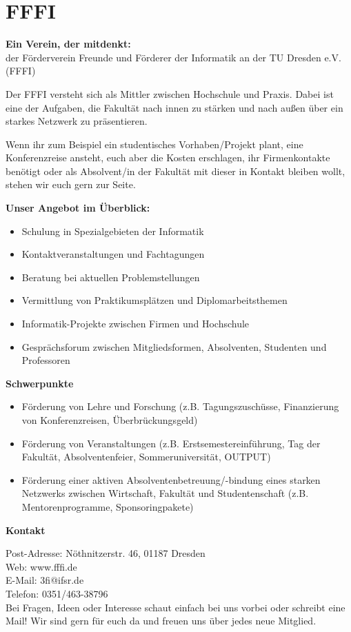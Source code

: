 \section{FFFI}

\textbf{Ein Verein, der mitdenkt:} \\
der Förderverein Freunde und Förderer der Informatik an der TU Dresden e.V. (FFFI)

Der FFFI versteht sich als Mittler zwischen Hochschule und Praxis.
Dabei ist eine der Aufgaben, die Fakultät nach innen zu stärken und nach außen über ein starkes Netzwerk zu präsentieren.

Wenn ihr zum Beispiel ein studentisches Vorhaben/Projekt plant, eine Konferenzreise ansteht, euch aber die Kosten erschlagen, ihr Firmenkontakte benötigt oder als Absolvent/in der Fakultät mit dieser in Kontakt bleiben wollt, stehen wir euch gern zur Seite.

\textbf{Unser Angebot im Überblick:}

\begin{itemize}
\item Schulung in Spezialgebieten der Informatik
\item Kontaktveranstaltungen und Fachtagungen
\item Beratung bei aktuellen Problemstellungen
\item Vermittlung von Praktikumsplätzen und Diplomarbeitsthemen
\item Informatik-Projekte zwischen Firmen und Hochschule
\item Gesprächsforum zwischen Mitgliedsformen, Absolventen, Studenten und Professoren
\end{itemize}

\textbf{Schwerpunkte}

\begin{itemize}
\item Förderung von Lehre und Forschung (z.B. Tagungszuschüsse, Finanzierung von Konferenzreisen, Überbrückungsgeld)
\item Förderung von Veranstaltungen (z.B. Erstsemestereinführung, Tag der Fakultät, Absolventenfeier, Sommeruniversität, OUTPUT)
\item Förderung einer aktiven Absolventenbetreuung/-bindung eines starken Netzwerks zwischen Wirtschaft, Fakultät und Studentenschaft (z.B. Mentorenprogramme, Sponsoringpakete)
\end{itemize}

\textbf{Kontakt}

Post-Adresse: Nöthnitzerstr. 46, 01187 Dresden \\
Web: www.fffi.de \\
E-Mail: 3fi@ifsr.de \\
Telefon: 0351/463-38796 \\

Bei Fragen, Ideen oder Interesse schaut einfach bei uns vorbei oder schreibt eine Mail!
Wir sind gern für euch da und freuen uns über jedes neue Mitglied.

